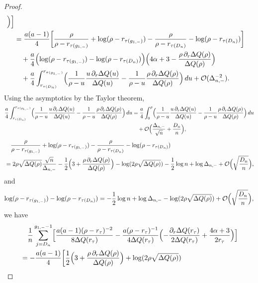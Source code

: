 \documentclass[reqno]{amsart}
\newcommand{\1}{\mathds{1}}
\numberwithin{equation}{section}
\theoremstyle{definition}
\begin{document}
\begin{proof}
\begin{align*}
\Bigr)
\Bigr]
\\
&=
\frac{a(a-1)}{4}\bigg[\frac{\rho}{\rho-r_{\tau(g_{1,-})}}+\log(\rho-r_{\tau(g_{1,-})})-\frac{\rho}{\rho-r_{\tau(D_n)}}-\log(\rho-r_{\tau(D_n)})\bigg]
\\
&\quad
+\frac{a}{4}\Bigl(\log(\rho-r_{\tau(g_{1,-})})-\log(\rho-r_{\tau(D_n)})\Bigr)
\Bigl(4\alpha+3-\frac{\rho\,\partial_r\Delta Q(\rho)}{\Delta Q(\rho)}\Bigr)
\\
&\quad
+\frac{a}{4}\int_{r_{\tau(D_n)}}^{r_{\tau(g_{1,-})}}\Bigl(\frac{1}{\rho-u}\frac{u\,\partial_r\Delta Q(u)}{\Delta Q(u)}-\frac{1}{\rho-u}\frac{\rho\,\partial_r\Delta Q(\rho)}{\Delta Q(\rho)}\Bigr)\,du
+\mathcal{O}(\Delta_{n,-}^{-2}).
\end{align*}
Using the asymptotics by the Taylor theorem, 
\begin{align*}
\frac{a}{4}\int_{r_{\tau(D_n)}}^{r_{\tau(g_{1,-})}}\Bigl(\frac{1}{\rho-u}\frac{u\,\partial_r\Delta Q(u)}{\Delta Q(u)}-\frac{1}{\rho-u}\frac{\rho\,\partial_r\Delta Q(\rho)}{\Delta Q(\rho)}\Bigr)\,du
&=
\frac{a}{4}\int_{0}^{\rho}\Bigl(\frac{1}{\rho-u}\frac{u\,\partial_r\Delta Q(u)}{\Delta Q(u)}-\frac{1}{\rho-u}\frac{\rho\,\partial_r\Delta Q(\rho)}{\Delta Q(\rho)}\Bigr)\,du
\\
&\quad
+\mathcal{O}\Bigl(\frac{\Delta_{n,-}}{\sqrt{n}}+\frac{D_n}{n}\Bigr), 
\end{align*}
\begin{align*}
&\quad\frac{\rho}{\rho-r_{\tau(g_{1,-})}}+\log(\rho-r_{\tau(g_{1,-})})-\frac{\rho}{\rho-r_{\tau(D_n)}}-\log(\rho-r_{\tau(D_n)})
\\
&=
2\rho\sqrt{\Delta Q(\rho)}\frac{\sqrt{n}}{\Delta_{n,-}}-\frac{1}{2}\Bigl(3+\frac{\rho\,\partial_r\Delta Q(\rho)}{\Delta Q(\rho)}\Bigr)-\log(2\rho\sqrt{\Delta Q(\rho)})-\frac{1}{2}\log n+\log\Delta_{n,-}+\mathcal{O}\Bigl(\sqrt{\frac{D_n}{n}}\Bigr), 
\end{align*}
and 
\[
\log(\rho-r_{\tau(g_{1,-})})-\log(\rho-r_{\tau(D_n)})
=-\frac{1}{2}\log n+\log\Delta_{n,-}-\log(2\rho\sqrt{\Delta Q(\rho)})
+\mathcal{O}\Bigl(\sqrt{\frac{D_n}{n}}\Bigr),
\]
we have 
\begin{align*}
&\quad\frac{1}{n}\sum_{j=D_n}^{g_{1,-}-1}
\Bigl[
\frac{a(a-1)(\rho-r_{\tau})^{-2}}{8\Delta Q(r_{\tau})}
-\frac{a(\rho-r_{\tau})^{-1}}{4\Delta Q(r_{\tau})}
\Bigl( 
-\frac{\partial_r\Delta Q(r_{\tau})}{2\Delta Q(r_{\tau})}+\frac{4\alpha+3}{2r_{\tau}}
\Bigr)
\Bigr]
\\
&=
-
\frac{a(a-1)}{4}\bigg[
\frac{1}{2}\Bigl(3+\frac{\rho\,\partial_r\Delta Q(\rho)}{\Delta Q(\rho)}\Bigr)
+\log(2\rho\sqrt{\Delta Q(\rho)})

\end{align*}
\end{proof}
\end{document}
